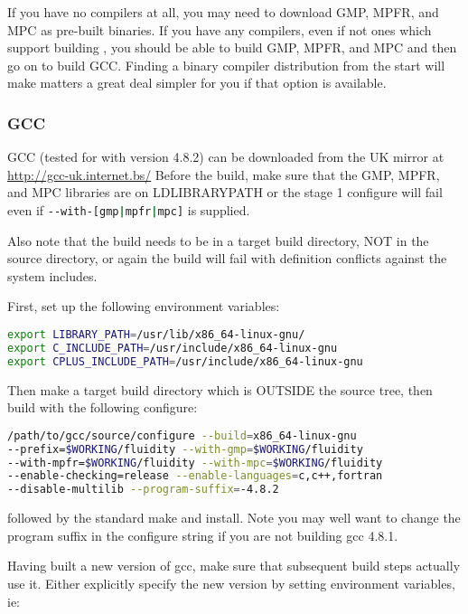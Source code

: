 If you have no compilers at all, you may need to download GMP, MPFR, and MPC as
pre-built binaries. If you have any compilers, even if not ones which support
building \fluidity, you should be able to build GMP, MPFR, and MPC and then go
on to build GCC. Finding a binary compiler distribution from the start will
make matters a great deal simpler for you if that option is available.

\subsubsection{GCC}
\label{sec:required_libraries_compilers_gcc}

GCC (tested for \fluidity with version 4.8.2) can be downloaded from the UK mirror at
\url{http://gcc-uk.internet.bs/} Before the build, make sure that the GMP,
MPFR, and MPC libraries are on LD{\textunderscore}LIBRARY{\textunderscore}PATH
or the stage 1 configure will fail even if
\lstinline[language=bash]+--with-[gmp|mpfr|mpc]+ is supplied.

Also note that the build needs to be in a target build directory, NOT in the
source directory, or again the build will fail with definition conflicts
against the system includes.

First, set up the following environment variables:
\begin{lstlisting}[language=bash]
export LIBRARY_PATH=/usr/lib/x86_64-linux-gnu/
export C_INCLUDE_PATH=/usr/include/x86_64-linux-gnu
export CPLUS_INCLUDE_PATH=/usr/include/x86_64-linux-gnu
\end{lstlisting}

Then make a target build directory which is OUTSIDE the source tree, then build
with the following configure:

\begin{lstlisting}[language=bash]
/path/to/gcc/source/configure --build=x86_64-linux-gnu
--prefix=$WORKING/fluidity --with-gmp=$WORKING/fluidity
--with-mpfr=$WORKING/fluidity --with-mpc=$WORKING/fluidity
--enable-checking=release --enable-languages=c,c++,fortran 
--disable-multilib --program-suffix=-4.8.2
\end{lstlisting}

followed by the standard make and install. Note you may well want to change the
program suffix in the configure string if you are not building gcc 4.8.1.

Having built a new version of gcc, make sure that subsequent build steps
actually use it. Either explicitly specify the new version by setting
environment variables, ie:

